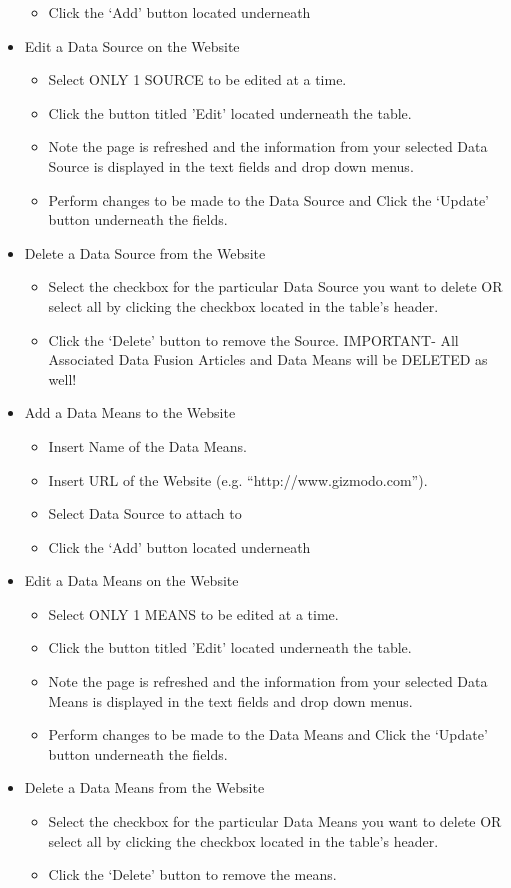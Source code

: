 \documentclass[11pt]{article} %
\begin{document}
\begin{itemize}
\begin{itemize}
	\item Click the ‘Add’ button located underneath
	\end{itemize}
\item Edit a Data Source on the Website
	\begin{itemize}
	\itemindent 10pt
	\item Select ONLY 1 SOURCE to be edited at a time.
	\item Click the button titled ’Edit’ located underneath the table.
	\item Note the page is refreshed and the information from your selected Data Source is displayed in the text fields and drop down menus.
	\item Perform changes to be made to the Data Source and Click the ‘Update’ button underneath the fields.
	\end{itemize}
\item Delete a Data Source from the Website
	\begin{itemize}
	\itemindent 10pt
	\item Select the checkbox for the particular Data Source you want to delete OR select all by clicking the checkbox located in the table’s header.
	\item Click the ‘Delete’ button to remove the Source. IMPORTANT- All Associated Data Fusion Articles and Data Means will be DELETED as well!  
	\end{itemize}
\item Add a Data Means to the Website
	\begin{itemize}
	\itemindent 10pt
	\item Insert Name of the Data Means.
	\item Insert URL of the Website (e.g. “http://www.gizmodo.com”).
	\item Select Data Source to attach to
	\item Click the ‘Add’ button located underneath
	\end{itemize}
\item Edit a Data Means on the Website
	\begin{itemize}
	\itemindent 10pt
	\item Select ONLY 1 MEANS to be edited at a time.
	\item Click the button titled ’Edit’ located underneath the table.
	\item Note the page is refreshed and the information from your selected Data Means is displayed in the text fields and drop down menus.
	\item Perform changes to be made to the Data Means and Click the ‘Update’ button underneath the fields.
	\end{itemize}
\item Delete a Data Means from the Website
	\begin{itemize}
	\itemindent 10pt
	\item Select the checkbox for the particular Data Means you want to delete OR select all by clicking the checkbox located in the table’s header.
	\item Click the ‘Delete’ button to remove the means.
	\end{itemize}
\end{itemize}
\end{document}
